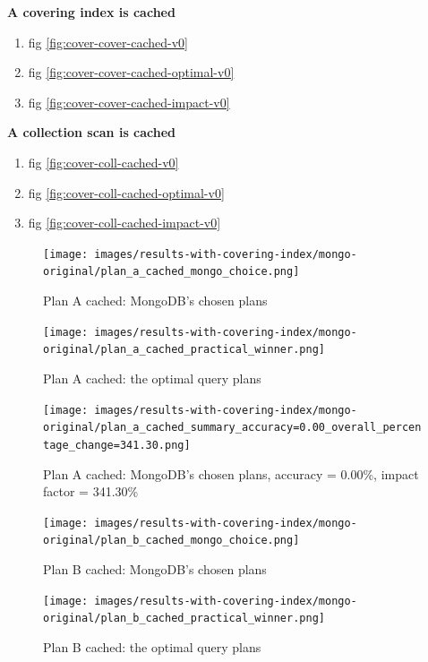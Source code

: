 \noindent\textbf{A covering index is cached}
\begin{enumerate}
    \item fig \ref{fig:cover-cover-cached-v0}
    \item fig \ref{fig:cover-cover-cached-optimal-v0}
    \item fig \ref{fig:cover-cover-cached-impact-v0}
\end{enumerate}

\noindent\textbf{A collection scan is cached}
\begin{enumerate}
    \item fig \ref{fig:cover-coll-cached-v0}
    \item fig \ref{fig:cover-coll-cached-optimal-v0}
    \item fig \ref{fig:cover-coll-cached-impact-v0}
\end{enumerate}




\begin{figure}[htb]
    \centering
    \texttt{[image: images/results-with-covering-index/mongo-original/plan\_a\_cached\_mongo\_choice.png]}
    \caption{Plan A cached: MongoDB's chosen plans}
    \label{fig:cover-a-cached-v0}
\end{figure}


\begin{figure}[htb]
    \centering
    \texttt{[image: images/results-with-covering-index/mongo-original/plan\_a\_cached\_practical\_winner.png]}
    \caption{Plan A cached: the optimal query plans}
    \label{fig:cover-a-cached-optimal-v0}
\end{figure}


\begin{figure}[htb]
    \centering
    \texttt{[image: images/results-with-covering-index/mongo-original/plan\_a\_cached\_summary\_accuracy=0.00\_overall\_percentage\_change=341.30.png]}
    \caption{Plan A cached: MongoDB's chosen plans, accuracy = 0.00\%, impact factor = 341.30\%}
    \label{fig:cover-a-cached-impact-v0}
\end{figure}


\begin{figure}[htb]
    \centering
    \texttt{[image: images/results-with-covering-index/mongo-original/plan\_b\_cached\_mongo\_choice.png]}
    \caption{Plan B cached: MongoDB's chosen plans}
    \label{fig:cover-b-cached-v0}
\end{figure}


\begin{figure}[htb]
    \centering
    \texttt{[image: images/results-with-covering-index/mongo-original/plan\_b\_cached\_practical\_winner.png]}
    \caption{Plan B cached: the optimal query plans}
    \label{fig:cover-b-cached-optimal-v0}
\end{figure}


